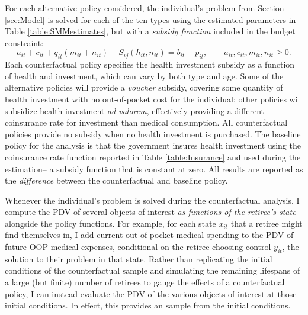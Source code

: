 \documentclass[12pt,pdftex,letterpaper]{article}
\newcommand{\Type}{\iota}
\newcommand{\Health}{h}
\newcommand{\Con}{c}
\newcommand{\Care}{m}
\newcommand{\Invst}{n}
\newcommand{\Bank}{b}
\newcommand{\Assets}{a}
\newcommand{\Premium}{p}
\newcommand{\Copay}{q}
\newcommand{\Subsidy}{S}
\newcommand{\Age}{j}
\newcommand{\State}{x}
\newcommand{\Control}{y}
\begin{document}
For each alternative policy considered, the individual's problem from Section \ref{sec:Model} is solved for each of the ten types using the estimated parameters in Table \ref{table:SMMestimates}, but with a \textit{subsidy function} included in the budget constraint:
\begin{equation} \label{BudgetAlt}
\Assets_{it} + \Con_{it} + \Copay_{it} (\Care_{it} + \Invst_{it}) - \Subsidy_{\Type \Age}(\Health_{it},\Invst_{it}) = \Bank_{it} - \Premium_{it}, \qquad \Assets_{it},\Con_{it}, \Care_{it}, \Invst_{it} \geq 0.
\end{equation}
Each counterfactual policy specifies the health investment subsidy as a function of health and investment, which can vary by both type and age.  Some of the alternative policies will provide a \textit{voucher} subsidy, covering some quantity of health investment with no out-of-pocket cost for the individual; other policies will subsidize health investment \textit{ad valorem}, effectively providing a different coinsurance rate for investment than medical consumption.  All counterfactual policies provide no subsidy when no health investment is purchased.  The baseline policy for the analysis is that the government insures health investment using the coinsurance rate function reported in Table \ref{table:Insurance} and used during the estimation-- a subsidy function that is constant at zero.  All results are reported as the \textit{difference} between the counterfactual and baseline policy.

Whenever the individual's problem is solved during the counterfactual analysis, I compute the PDV of several objects of interest \textit{as functions of the retiree's state} alongside the policy functions.  For example, for each state $\State_{it}$ that a retiree might find themselves in, I add current out-of-pocket medical spending to the PDV of future OOP medical expenses, conditional on the retiree choosing control $\Control_{it}$, the solution to their problem in that state.  Rather than replicating the initial conditions of the counterfactual sample and simulating the remaining lifespans of a large (but finite) number of retirees to gauge the effects of a counterfactual policy, I can instead evaluate the PDV of the various objects of interest at those initial conditions.  In effect, this provides an  sample from the initial conditions.
\end{document}

